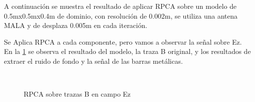A continuación se muestra el resultado de aplicar RPCA sobre un modelo de 0.5mx0.5mx0.4m de dominio, con resolución de 0.002m, se utiliza una antena MALA y de desplaza 0.005m en cada iteración.

Se Aplica RPCA a cada componente, pero vamos a observar la señal sobre Ez. En la \figurename{ \ref{fig:bscanRPCA_SIM1}} se observa el resultado del modelo, la traza B original,  y los resultados de extraer el ruido de fondo y la señal de las barras metálicas.



\begin{figure}[H]  
\centering
{}
 \\

\caption{RPCA sobre trazas B en campo Ez}
\label{fig:bscanRPCA_SIM1}


\end{figure}

